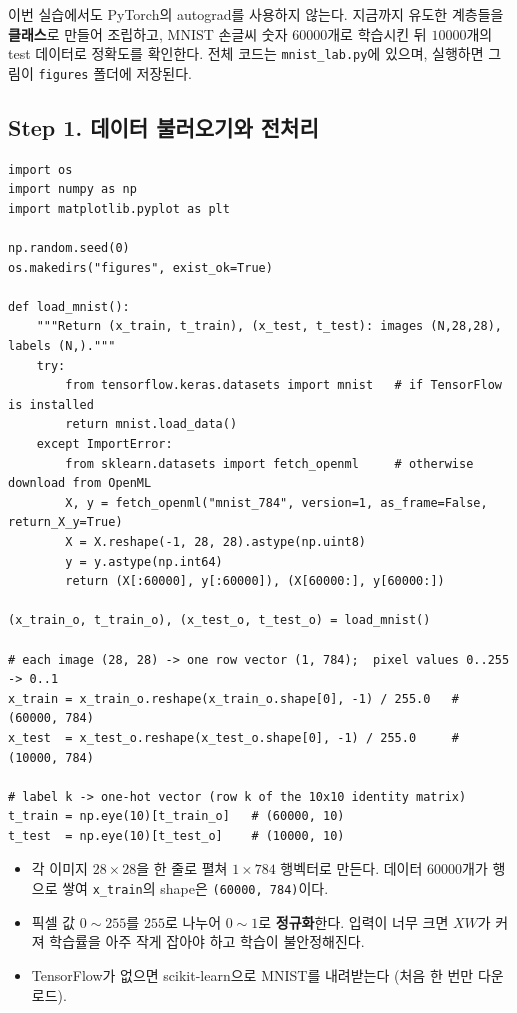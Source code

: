 \documentclass[11pt,a4paper]{article}
\begin{document}
이번 실습에서도 PyTorch의 autograd를 사용하지 않는다.
지금까지 유도한 계층들을 \textbf{클래스}로 만들어 조립하고,
MNIST 손글씨 숫자 $60000$개로 학습시킨 뒤 $10000$개의 test 데이터로 정확도를 확인한다.
전체 코드는 \texttt{mnist\_lab.py}에 있으며, 실행하면 그림이 \texttt{figures} 폴더에 저장된다.

\subsection{Step 1. 데이터 불러오기와 전처리}

\begin{lstlisting}
import os
import numpy as np
import matplotlib.pyplot as plt

np.random.seed(0)
os.makedirs("figures", exist_ok=True)

def load_mnist():
    """Return (x_train, t_train), (x_test, t_test): images (N,28,28), labels (N,)."""
    try:
        from tensorflow.keras.datasets import mnist   # if TensorFlow is installed
        return mnist.load_data()
    except ImportError:
        from sklearn.datasets import fetch_openml     # otherwise download from OpenML
        X, y = fetch_openml("mnist_784", version=1, as_frame=False, return_X_y=True)
        X = X.reshape(-1, 28, 28).astype(np.uint8)
        y = y.astype(np.int64)
        return (X[:60000], y[:60000]), (X[60000:], y[60000:])

(x_train_o, t_train_o), (x_test_o, t_test_o) = load_mnist()

# each image (28, 28) -> one row vector (1, 784);  pixel values 0..255 -> 0..1
x_train = x_train_o.reshape(x_train_o.shape[0], -1) / 255.0   # (60000, 784)
x_test  = x_test_o.reshape(x_test_o.shape[0], -1) / 255.0     # (10000, 784)

# label k -> one-hot vector (row k of the 10x10 identity matrix)
t_train = np.eye(10)[t_train_o]   # (60000, 10)
t_test  = np.eye(10)[t_test_o]    # (10000, 10)
\end{lstlisting}

\begin{itemize}[leftmargin=1.8em]
\item 각 이미지 $28\times28$을 한 줄로 펼쳐 $1\times784$ 행벡터로 만든다.
데이터 $60000$개가 행으로 쌓여 \texttt{x\_train}의 shape은 \texttt{(60000, 784)}이다.
\item 픽셀 값 $0\sim255$를 $255$로 나누어 $0\sim1$로 \textbf{정규화}한다.
입력이 너무 크면 $XW$가 커져 학습률을 아주 작게 잡아야 하고 학습이 불안정해진다.
\item TensorFlow가 없으면 scikit-learn으로 MNIST를 내려받는다 (처음 한 번만 다운로드).
\end{itemize}
\end{document}

